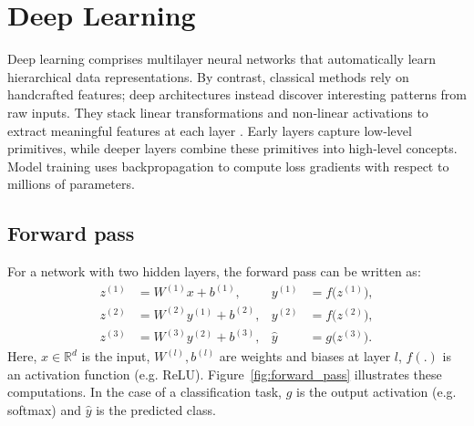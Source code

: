 \section{Deep Learning}
\label{sec:deep_learning}

Deep learning comprises multilayer neural networks that automatically learn hierarchical data representations. By contrast, classical methods rely on handcrafted features; deep architectures instead discover interesting patterns from raw inputs. They stack linear transformations and non‑linear activations to extract meaningful features at each layer \cite{lecun_deep_learning_2015}. 
Early layers capture low‑level primitives, while deeper layers combine these primitives into high‑level concepts. Model training uses backpropagation to compute loss gradients with respect to millions of parameters. 

\subsection{Forward pass}
For a network with two hidden layers, the forward pass can be written as:
\begin{align}
z^{(1)} &= W^{(1)} x + b^{(1)}, & y^{(1)} &= f\bigl(z^{(1)}\bigr), \\
z^{(2)} &= W^{(2)} y^{(1)} + b^{(2)}, & y^{(2)} &= f\bigl(z^{(2)}\bigr), \\
z^{(3)} &= W^{(3)} y^{(2)} + b^{(3)}, & \hat{y} &= g\bigl(z^{(3)}\bigr).
\end{align}
Here, \(x\in\mathbb{R}^d\) is the input, \(W^{(l)},b^{(l)}\) are weights and biases at layer \(l\), \(f(.)\) is an activation function (e.g. ReLU). Figure~\ref{fig:forward_pass} illustrates these computations. In the case of a classification task, \(g\) is the output activation (e.g. softmax) and \(\hat{y}\) is the predicted class.

